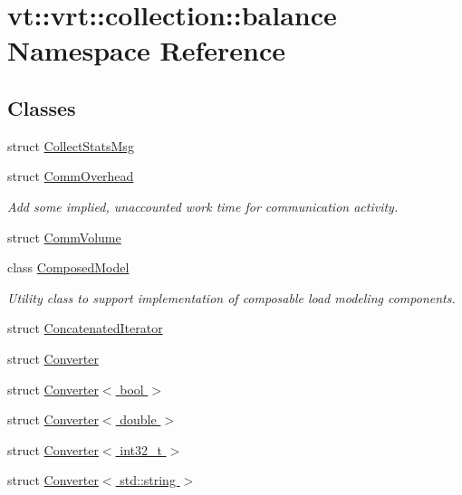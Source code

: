 \hypertarget{namespacevt_1_1vrt_1_1collection_1_1balance}{}\section{vt\+:\+:vrt\+:\+:collection\+:\+:balance Namespace Reference}
\label{namespacevt_1_1vrt_1_1collection_1_1balance}
\subsection*{Classes}
\begin{DoxyCompactItemize}
\item 
struct \hyperlink{structvt_1_1vrt_1_1collection_1_1balance_1_1_collect_stats_msg}{Collect\+Stats\+Msg}
\item 
struct \hyperlink{structvt_1_1vrt_1_1collection_1_1balance_1_1_comm_overhead}{Comm\+Overhead}
\begin{DoxyCompactList}\small\item\em Add some implied, unaccounted work time for communication activity. \end{DoxyCompactList}\item 
struct \hyperlink{structvt_1_1vrt_1_1collection_1_1balance_1_1_comm_volume}{Comm\+Volume}
\item 
class \hyperlink{classvt_1_1vrt_1_1collection_1_1balance_1_1_composed_model}{Composed\+Model}
\begin{DoxyCompactList}\small\item\em Utility class to support implementation of composable load modeling components. \end{DoxyCompactList}\item 
struct \hyperlink{structvt_1_1vrt_1_1collection_1_1balance_1_1_concatenated_iterator}{Concatenated\+Iterator}
\item 
struct \hyperlink{structvt_1_1vrt_1_1collection_1_1balance_1_1_converter}{Converter}
\item 
struct \hyperlink{structvt_1_1vrt_1_1collection_1_1balance_1_1_converter_3_01bool_01_4}{Converter$<$ bool $>$}
\item 
struct \hyperlink{structvt_1_1vrt_1_1collection_1_1balance_1_1_converter_3_01double_01_4}{Converter$<$ double $>$}
\item 
struct \hyperlink{structvt_1_1vrt_1_1collection_1_1balance_1_1_converter_3_01int32__t_01_4}{Converter$<$ int32\+\_\+t $>$}
\item 
struct \hyperlink{structvt_1_1vrt_1_1collection_1_1balance_1_1_converter_3_01std_1_1string_01_4}{Converter$<$ std\+::string $>$}

\end{DoxyCompactItemize}
